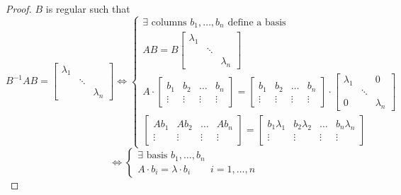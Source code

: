 \documentclass{article}
\begin{document}
\begin{proof}
  $B$ is regular such that
  \[
    B^{-1} AB = \begin{bmatrix} \lambda_1 & & \\ & \ddots & \\ & & \lambda_n \end{bmatrix}
    \iff \begin{cases}
      \exists \text{ columns } b_{1}, \dots, b_n \text{ define a basis} \\
      AB = B \begin{bmatrix} \lambda_1 & & \\ & \ddots & \\ & & \lambda_n \end{bmatrix} \\
      A \cdot \begin{bmatrix} b_1 & b_2 & \dots & b_n \\ \vdots & \vdots & \vdots & \vdots \end{bmatrix} = \begin{bmatrix} b_1 & b_2 & \dots & b_n \\ \vdots & \vdots & \vdots & \vdots \end{bmatrix} \cdot \begin{bmatrix} \lambda_1 &  & 0 \\ & \ddots & \\ 0 & & \lambda_n \end{bmatrix} \\
      \begin{bmatrix} Ab_1 & Ab_2 & \dots & Ab_n \\ \vdots & \vdots & \vdots & \vdots \end{bmatrix} = \begin{bmatrix} b_1 \lambda_1 & b_2 \lambda_2 & \dots & b_n \lambda_n \\ \vdots & \vdots & \vdots & \vdots \end{bmatrix}
    \end{cases}
  \] \[
    \iff \begin{cases}
      \exists \text{ basis } b_1, \dots, b_n \\
      A \cdot b_i = \lambda \cdot b_i \qquad i = 1, \dots, n
    \end{cases}
  \]
\end{proof}
\end{document}
